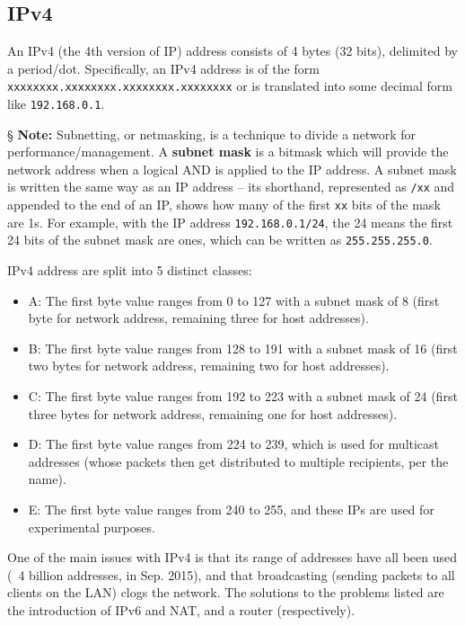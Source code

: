 \documentclass{report}
\newcommand{\npar}{\par\noindent}
\newcommand{\vpar}{\vspace{1em}\npar}
\newcommand{\note}{\vpar \S \textbf{ Note: }}
\begin{document}
\subsection{IPv4}
\par An IPv4 (the 4th version of IP) address consists of 4 bytes (32 bits), delimited by a period/dot. Specifically, an IPv4 address is of the form \verb|xxxxxxxx.xxxxxxxx.xxxxxxxx.xxxxxxxx| or is translated into some decimal form like \verb|192.168.0.1|.

\note Subnetting, or netmasking, is a technique to divide a network for performance/management. A \textbf{subnet mask} is a bitmask which will provide the network address when a logical AND is applied to the IP address. A subnet mask is written the same way as an IP address -- its shorthand, represented as \verb|/xx| and appended to the end of an IP, shows how many of the first \verb|xx| bits of the mask are 1s. For example, with the IP address \verb|192.168.0.1/24|, the 24 means the first 24 bits of the subnet mask are ones, which can be written as \verb|255.255.255.0|.

\vpar IPv4 address are split into 5 distinct classes:
\begin{itemize}
    \item A: The first byte value ranges from 0 to 127 with a subnet mask of 8 (first byte for network address, remaining three for host addresses).
    \item B: The first byte value ranges from 128 to 191 with a subnet mask of 16 (first two bytes for network address, remaining two for host addresses).
    \item C: The first byte value ranges from 192 to 223 with a subnet mask of 24 (first three bytes for network address, remaining one for host addresses).
    \item D: The first byte value ranges from 224 to 239, which is used for multicast addresses (whose packets then get distributed to multiple recipients, per the name).
    \item E: The first byte value ranges from 240 to 255, and these IPs are used for experimental purposes.
\end{itemize}

\npar One of the main issues with IPv4 is that its range of addresses have all been used (~4 billion addresses, in Sep. 2015), and that broadcasting (sending packets to all clients on the LAN) clogs the network. The solutions to the problems listed are the introduction of IPv6 and NAT, and a router (respectively).
\end{document}
